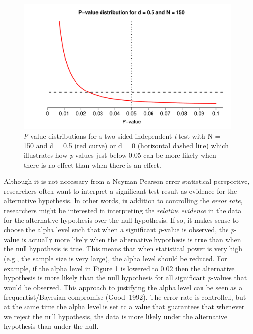 \documentclass[
  english,
  ,man, a4paper,floatsintext]{apa6}
\begin{document}
\begin{figure}
\centering
\includegraphics{Justify_in_Practice_files/figure-latex/p-plot-1.pdf}
\caption{\label{fig:p-plot}\emph{P}-value distributions for a two-sided independent \emph{t}-test with N = 150 and d = 0.5 (red curve) or d = 0 (horizontal dashed line) which illustrates how \emph{p}-values just below 0.05 can be more likely when there is no effect than when there is an effect.}
\end{figure}

Although it is not necessary from a Neyman-Pearson error-statistical perspective, researchers often want to interpret a significant test result as evidence for the alternative hypothesis. In other words, in addition to controlling the \emph{error rate}, researchers might be interested in interpreting the \emph{relative evidence} in the data for the alternative hypothesis over the null hypothesis. If so, it makes sense to choose the alpha level such that when a significant \emph{p}-value is observed, the \emph{p}-value is actually more likely when the alternative hypothesis is true than when the null hypothesis is true. This means that when statistical power is very high (e.g., the sample size is very large), the alpha level should be reduced. For example, if the alpha level in Figure \ref{fig:p-plot} is lowered to 0.02 then the alternative hypothesis is more likely than the null hypothesis for all significant \emph{p}-values that would be observed. This approach to justifying the alpha level can be seen as a frequentist/Bayesian compromise (Good, 1992). The error rate is controlled, but at the same time the alpha level is set to a value that guarantees that whenever we reject the null hypothesis, the data is more likely under the alternative hypothesis than under the null.
\end{document}
